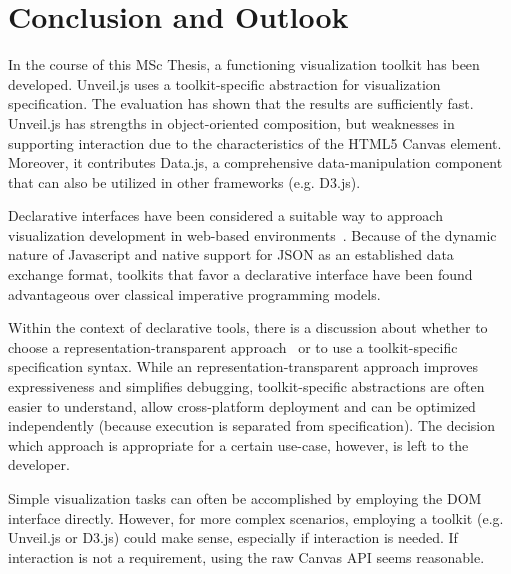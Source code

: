 \chapter{Conclusion and Outlook}
\label{cha:conclusion}


In the course of this MSc Thesis, a functioning visualization toolkit has been developed. Unveil.js uses a toolkit-specific abstraction for visualization specification. The evaluation has shown that the results are sufficiently fast. Unveil.js has strengths in object-oriented composition, but weaknesses in supporting interaction due to the characteristics of the HTML5 Canvas element. Moreover, it contributes Data.js, a comprehensive data-manipulation component that can also be utilized in other frameworks (e.g. D3.js).


Declarative interfaces have been considered a suitable way to approach visualization development in web-based environments~\cite{Protovis09}. Because of the dynamic nature of Javascript and native support for JSON as an established data exchange format, toolkits that favor a declarative interface have been found advantageous over classical imperative programming models.

Within the context of declarative tools, there is a discussion about whether to choose a representation-transparent approach~\cite{D3} or to use a toolkit-specific specification syntax. While an representation-transparent approach improves expressiveness and simplifies debugging, toolkit-specific abstractions are often easier to understand, allow cross-platform deployment and can be optimized independently (because execution is separated from specification). The decision which approach is appropriate for a certain use-case, however, is left to the developer.

Simple visualization tasks can often be accomplished by employing the DOM interface directly. However, for more complex scenarios, employing a toolkit (e.g. Unveil.js or D3.js) could make sense, especially if interaction is needed. If interaction is not a requirement, using the raw Canvas API seems reasonable.

